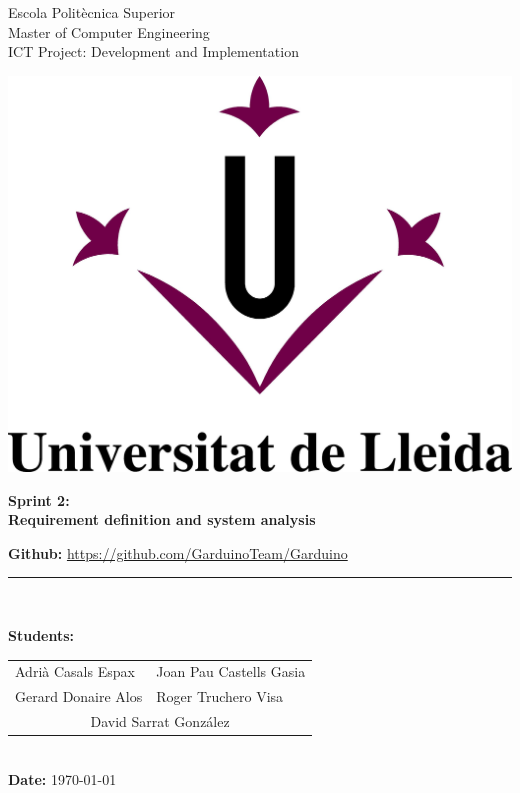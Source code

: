 \documentclass[11pt,a4paper]{article}
\begin{document}
\begin{titlepage}

\begin{flushleft}
Escola Politècnica Superior\\
\vspace*{0.15in}
Master of Computer Engineering\\
\vspace*{0.15in}
ICT Project: Development and Implementation
\end{flushleft}

\begin{center}
\vspace{2.0cm}\includegraphics[scale=0.3]{figures/M-UdL.jpg}
\vspace{4.0cm}

\begin{LARGE}
\textbf{Sprint 2:}\\ 
\vspace*{0.15in}
\textbf{Requirement definition and system analysis}
\end{LARGE}
\vspace{5.0cm}

\vspace*{0.25in}
\textbf{Github: } \url{https://github.com/GarduinoTeam/Garduino}
\rule{80mm}{0.1mm}\\
\vspace*{0.1in}

\begin{large}
\textbf{Students:}

\begin{tabular}{ll}
Adrià Casals Espax  & Joan Pau Castells Gasia \\
Gerard Donaire Alos  & Roger Truchero Visa \\
\multicolumn{2}{c}{David Sarrat González}
\end{tabular}
\\
\vspace*{0.25in}
\textbf{Date:} \today \\
\end{large}

\end{center}
\end{titlepage}
 
\end{document}
